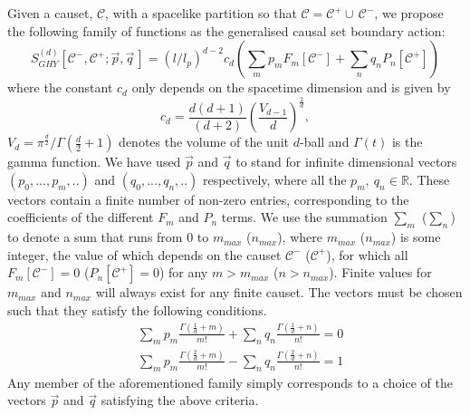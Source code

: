 \documentclass[12pt]{article}
\newcommand{\be}{\begin{equation}}
\newcommand{\ee}{\end{equation}}
\newcommand{\F}[1]{F_{#1}}
\renewcommand{\P}[1]{P_{#1}}
\begin{document}
Given a causet, $\mathcal{C}$, with a spacelike partition so that $\mathcal C = \mathcal C^+ \cup\, \mathcal C^-$, we propose the following family of functions as the generalised causal set boundary action:
\be\label{general_boundary_sum}
S^{ (d)}_{GHY}\left[\mathcal{C}^-,\mathcal{C}^+;\vec{p}, \vec{q}\,\right]= \left (l/l_p\right)^{d-2} c_{d}
\left ( \sum_m p_m \F{m}\left[\mathcal{C}^- \right]
+  \sum_n q_n \P{n}\left[\mathcal{C}^+ \right]\right)
\ee
where the constant $c_{d}$ only depends on the spacetime dimension and is given by
\be\label{Cn}
c_{d}=\frac{d (d+1)}{ (d+2)}\left(\frac{V_{d-1}}{d}\right)^{\frac{2}{d}},
\ee
$V_d=\pi^{\frac{d}{2}}/\Gamma\left (\frac{d}{2}+1\right)$ denotes the volume of the unit $d$-ball and $\Gamma (t)$ is the gamma function. We have used $\vec{p}$ and $\vec{q}$ to stand for infinite dimensional vectors $ (p_0,...,p_m,..)$ and $ (q_0,...,q_n,..)$ respectively, where all the $p_m,\: q_n \in \mathbb{R}$. These vectors contain a finite number of non-zero entries, corresponding to the coefficients of the different $\F{m}$ and $\P{n}$ terms. We use the summation $\sum_m$ ($\sum_n$) to denote a sum that runs from $0$ to $m_{max}$ ($n_{max}$), where $m_{max}$ ($n_{max}$) is some integer, the value of which depends on the causet $\mathcal{C}^-$ ($\mathcal{C}^+$), for which all $\F{m}\left[\mathcal{C}^- \right]=0$ ($\P{n}\left[\mathcal{C}^+ \right]=0$) for any $m>m_{max}$ ($n>n_{max}$). Finite values for $m_{max}$ and $n_{max}$ will always exist for any finite causet. The vectors must be chosen such that they satisfy the following conditions.
\begin{align}\label{coefficient_relation1}
& \sum_m p_m \frac{\Gamma\left (\frac{1}{d}+m \right)}{m!}  + \sum_n q_n\frac{\Gamma\left (\frac{1}{d}+n \right)}{n!}=0
\\
& \label{coefficient_relation2}\sum_m p_m \frac{\Gamma\left (\frac{2}{d}+m \right)}{m!}  - \sum_n q_n\frac{\Gamma\left (\frac{2}{d}+n \right)}{n!}=1
\end{align}
Any member of the aforementioned family simply corresponds to a choice of the vectors $\vec{p}$ and $\vec{q}$ satisfying the above criteria.
\end{document}
